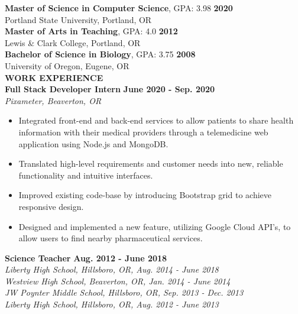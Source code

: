 \documentclass[11pt]{article}
\begin{document}
%
\textbf{Master of Science in Computer Science}, GPA: 3.98
\hfill \textbf{2020}\\ 
Portland State University, Portland, OR
\medskip \\
%
\textbf{Master of Arts in Teaching}, GPA: 4.0
\hfill \textbf{2012} \\
Lewis \& Clark College, Portland, OR
\medskip \\
%
\textbf{Bachelor of Science in Biology}, GPA: 3.75
\hfill \textbf{2008}\\
University of Oregon, Eugene, OR
\bigskip \\
\makebox[0pt][l]{\rule[-.2\baselineskip]{\linewidth}{.3mm}}%
\large{\textbf{WORK EXPERIENCE}}\smallskip \\
%
\textbf{Full Stack Developer Intern} \hfill \textbf{June 2020 - Sep. 2020}\\
\textit{Pixameter, Beaverton, OR}
\begin{itemize}[leftmargin=*, itemsep=0pt, topsep=5pt]
	\item Integrated front-end and back-end services to allow patients to share health information with their medical providers through a telemedicine web application using Node.js and MongoDB.
	\item Translated high-level requirements and customer needs into new, reliable functionality and intuitive interfaces.
	\item Improved existing code-base by introducing Bootstrap grid to achieve responsive design.
	\item Designed and implemented a new feature, utilizing Google Cloud API's, to allow users to find nearby pharmaceutical services.
\end{itemize}
\medbreak \noindent
%
\textbf{Science Teacher} \hfill \textbf{Aug. 2012 - June 2018}\\
\textit{Liberty High School, Hillsboro, OR, Aug. 2014 - June 2018}\\
\textit{Westview High School, Beaverton, OR, Jan. 2014 - June 2014}\\
\textit{JW Poynter Middle School, Hillsboro, OR, Sep. 2013 - Dec. 2013}\\
\textit{Liberty High School, Hillsboro, OR, Aug. 2012 - June 2013}
\end{document}
